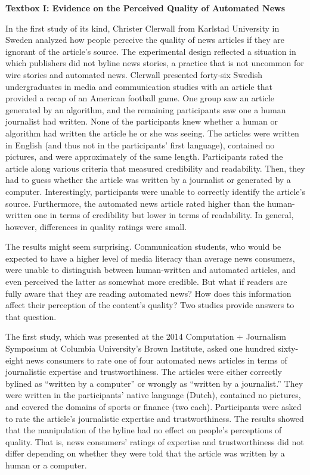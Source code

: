 \documentclass[notoc, symmetric, nobib, nols]{towcenter-guideto-book}
\begin{document}
\begin{framed}
\noindent\textbf{Textbox I: Evidence on the Perceived Quality of Automated News} 

In the first study of its kind, Christer Clerwall from Karlstad University in Sweden analyzed how people perceive the quality of news articles if they are ignorant of the article's source.\autocite{clerwall15} The experimental design reflected a situation in which publishers did not byline news stories, a practice that is not uncommon for wire stories and automated news.\autocite{ulanoff14} Clerwall presented forty-six Swedish undergraduates in media and communication studies with an article that provided a recap of an American football game. One group saw an article generated by an algorithm, and the remaining participants saw one a human journalist had written. None of the participants knew whether a human or algorithm had written the article he or she was seeing. The articles were written in English (and thus not in the participants' first language), contained no pictures, and were approximately of the same length. Participants rated the article along various criteria that measured credibility and readability. Then, they had to guess whether the article was written by a journalist or generated by a computer. Interestingly, participants were unable to correctly identify the article's source. Furthermore, the automated news article rated higher than the human-written one in terms of credibility but lower in terms of readability. In general, however, differences in quality ratings were small.

The results might seem surprising. Communication students, who would be expected to have a higher level of media literacy than average news consumers, were unable to distinguish between human-written and automated articles, and even perceived the latter as somewhat more credible. But what if readers are fully aware that they are reading automated news? How does this information affect their perception of the content's quality? Two studies provide answers to that question. 

The first study, which was presented at the 2014 Computation + Journalism Symposium at Columbia University's Brown Institute, asked one hundred sixty-eight news consumers to rate one of four automated news articles in terms of journalistic expertise and trustworthiness.\autocite{kaa14} The articles were either correctly bylined as ``written by a computer'' or wrongly as ``written by a journalist.'' They were written in the participants' native language (Dutch), contained no pictures, and covered the domains of sports or finance (two each). Participants were asked to rate the article's journalistic expertise and trustworthiness. The results showed that the manipulation of the byline had no effect on people's perceptions of quality. That is, news consumers' ratings of expertise and trustworthiness did not differ depending on whether they were told that the article was written by a human or a computer. 


\end{framed}
\end{document}
